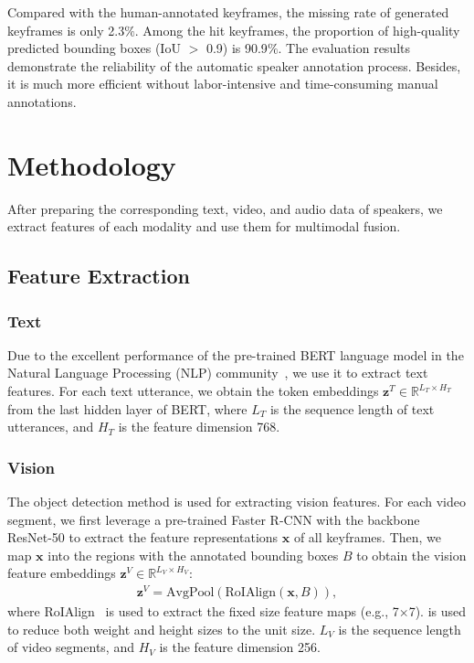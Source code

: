 \documentclass[sigconf,camera-ready]{acmart}
\begin{document}
Compared with the human-annotated keyframes, the missing rate of generated keyframes is only 2.3$\%$. Among the hit keyframes, the proportion of high-quality predicted bounding boxes  (IoU $>$ 0.9) is 90.9$\%$. The evaluation results demonstrate the reliability of the automatic speaker annotation process. Besides, it is much more efficient without labor-intensive and time-consuming manual annotations. 

\section{Methodology}
After preparing the corresponding text, video, and audio data of speakers, we extract features of each modality and use them for multimodal fusion.

\subsection{Feature Extraction}

\subsubsection{Text} Due to the excellent performance of the pre-trained BERT language model in the Natural Language Processing (NLP) community~\cite{BERT}, we use it to extract text features. For each text utterance, we obtain the token embeddings   $\mathbf{z}^{T} \in \mathds R^{L_{T} \times H_{T}}$ from the last hidden layer of BERT, where $L_{T}$ is the sequence length of text utterances, and $H_{T}$ is the feature dimension 768.

\subsubsection{Vision} The object detection method is used for extracting vision features. For each video segment, we first leverage a pre-trained Faster R-CNN with the backbone ResNet-50 to extract the feature representations $\mathbf{x}$ of all keyframes. Then, we map $\mathbf{x}$ into the regions with the annotated bounding boxes $B$ to obtain the vision feature embeddings $\mathbf{z}^{V} \in \mathds R^{L_{V} \times H_{V}}$:
\begin{align}
\mathbf{z}^{V} = \text{AvgPool} (\text{RoIAlign} (\mathbf{x}, B)),
\end{align}
where RoIAlign~\cite{he2017mask} is used to extract the fixed size feature maps (e.g., 7$\times$7).  is used to reduce both weight and height sizes to the unit size. $L_{V}$ is the sequence length of video segments, and $H_{V}$ is the feature dimension 256.
\end{document}
